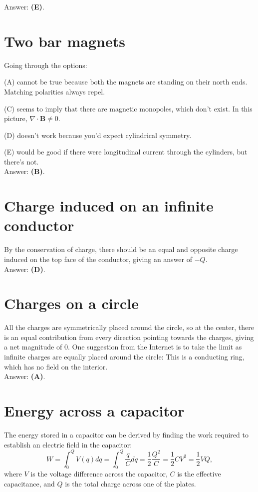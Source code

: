\documentclass[11pt]{paper}
\newcommand{\answer}[1]{Answer: \textbf{(#1)}.}
\begin{document}
\answer{E}

\section{Two bar magnets}
Going through the options:

(A) cannot be true because both the magnets are standing on their north ends.  Matching polarities always repel.

(C) seems to imply that there are magnetic monopoles, which don't exist.  In this picture, $\nabla \cdot \mathbf{B} \neq 0$.

(D) doesn't work because you'd expect cylindrical symmetry.

(E) would be good if there were longitudinal current through the cylinders, but there's not.\\

\answer{B}

\section{Charge induced on an infinite conductor}
By the conservation of charge, there should be an equal and opposite charge induced on the top face of the conductor, giving an answer of $-Q$.\\

\answer{D}

\section{Charges on a circle}
All the charges are symmetrically placed around the circle, so at the center, there is an equal contribution from every direction pointing towards the charges, giving a net magnitude of 0.  One suggestion from the Internet is to take the limit as infinite charges are equally placed around the circle:  This is a conducting ring, which has no field on the interior.\\

\answer{A}

\section{Energy across a capacitor}
The energy stored in a capacitor can be derived by finding the work required to establish an electric field in the capacitor:
\begin{equation}
W = \int_0^Q V(q) dq = \int_0^Q \frac{q}{C} dq = \frac{1}{2} \frac{Q^2}{C} = \frac{1}{2} CV^2 = \frac{1}{2} V Q,
\end{equation}
where $V$ is the voltage difference across the capacitor, $C$ is the effective capacitance, and $Q$ is the total charge across one of the plates.
\end{document}
